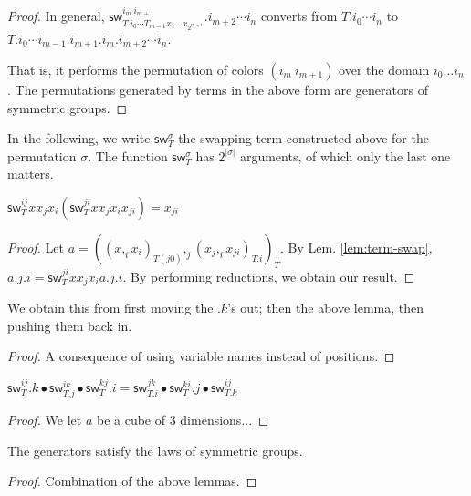 \documentclass[10pt,a4paper]{article}
\newcommand\CC[4]{(#2,_{#1} #3)_{#4}}
\newcommand\sw[2]{\mathsf{sw}^{#1}_{#2}}
\begin{document}
\begin{proof}
  In general, $\sw{i_m~i_{m+1}} {T.i_0⋯T_{m-1} x_1 …
    x_{2^{m-1}}}.i_{m+2}⋯i_n$ converts from $T.i_0 ⋯ i_n$ to
  $T.i_0⋯i_{m-1}.i_{m+1}.i_m .i_{m+2}⋯i_n$.

  That is, it performs the permutation of colors $(i_m~i_{m+1})$ over
  the domain $i_0 … i_n$. The permutations generated by terms in the
  above form are generators of symmetric groups.
\end{proof}

In the following, we write $\sw {σ} T$ the swapping term constructed
above for the permutation $σ$. The function $\sw {σ} T$ has $2^{|σ|}$
arguments, of which only the last one matters.

\begin{lemma}
  $\sw{ij} T x x_j x_i (\sw {ji} T x x_j x_i x_{ji}) = x_{ji}$ 
\end{lemma}
\begin{proof}
  Let $a = \CC j {\CC i x {x_i} {T(j0)}} {\CC i {x_j} {x_{ji}} {T.i}} T$.
  By Lem. \ref{lem:term-swap}, $a.j.i = \sw {ji} T x x_j x_i
  a.j.i$. By performing reductions, we obtain our result.
\end{proof}
\begin{lemma}[$σ_i^2 = 1$]
  We obtain this from first moving the $.k$'s out; then the above lemma, then pushing them back in.
\end{lemma}
\begin{lemma}[$σ_i ∘ σ_j = σ_j ∘ σ_i$ if $abs(j-i) > 1$]
  
\end{lemma}
\begin{proof}
  A consequence of using variable names instead of positions.
\end{proof}
\begin{lemma}
  [$\sigma_i ∘\sigma_{i+1} ∘\sigma_i = \sigma_{i+1} ∘\sigma_i ∘\sigma_{i+1}$]
  $\sw{ij}{T}.k ∙ \sw{ik}{T.j} ∙ \sw{kj}T.i = \sw{jk}{T.i} ∙ \sw{ki}T.j ∙ \sw{ij}{T.k}$
\end{lemma}
\begin{proof}
  We let $a$ be a cube of 3 dimensions...
\end{proof}
\begin{theorem}
  The generators satisfy the laws of symmetric groups.
\end{theorem}
\begin{proof}
  Combination of the above lemmas.
\end{proof}
\end{document}
